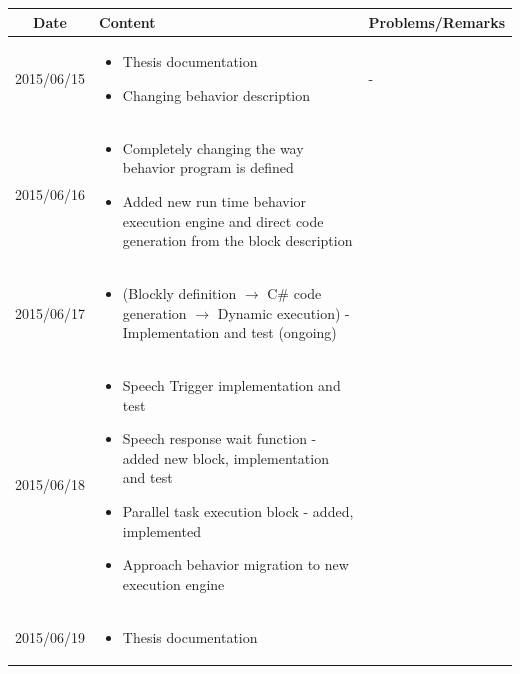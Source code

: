 \documentclass[11pt]{article} %
\begin{document}
\begin{center}
    \begin{longtable}{ | c | p{6cm} | p{5cm} |}
    \hline
    Date & Content & Problems/Remarks \\ 
    \endhead
    \hline    
     2015/06/15         & 
  	\begin{itemize}
  	\item Thesis documentation
  	\item Changing behavior description
	\end{itemize}  
   & - \\
\hline
  										 
 2015/06/16         & 
  \begin{itemize}
  \item Completely changing the way behavior program is defined
  \item Added new run time behavior execution engine and direct code generation from the block description
\end{itemize}   
& 
 \\
\hline
  										 
  
  2015/06/17        & 
  \begin{itemize}
  \item (Blockly definition $\rightarrow$ C\# code generation $\rightarrow$ Dynamic execution) - Implementation and test (ongoing)
  \end{itemize}   
  										 & 
 
  										 \\
  \hline
  
  2015/06/18         & 
  \begin{itemize}
  \item Speech Trigger implementation and test
  \item Speech response wait function - added new block, implementation and test
  \item Parallel task execution block - added, implemented
  \item Approach behavior migration to new execution engine
  \end{itemize}
  & 
\\  										 \hline

  2015/06/19         & 
  \begin{itemize}
  \item Thesis documentation
\end{itemize}   
  & 
\\  										 \hline										 							 
  										   								 
    \end{longtable}
\end{center}
\end{document}
